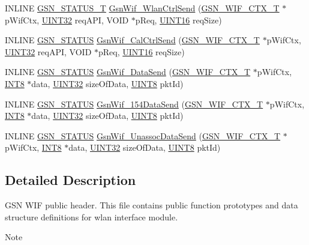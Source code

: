 \begin{DoxyCompactItemize}
\item 
INLINE \hyperlink{a00659_gae36517c0f5872426a7034c9551eb96ac}{GSN\_\-STATUS\_\-T} \hyperlink{a00605_a4192624248f21f0d8d02527671c4fb4d}{GsnWif\_\-WlanCtrlSend} (\hyperlink{a00323}{GSN\_\-WIF\_\-CTX\_\-T} $\ast$pWifCtx, \hyperlink{a00660_gae1e6edbbc26d6fbc71a90190d0266018}{UINT32} reqAPI, VOID $\ast$pReq, \hyperlink{a00660_ga09f1a1fb2293e33483cc8d44aefb1eb1}{UINT16} reqSize)
\item 
INLINE \hyperlink{a00660_gada5951904ac6110b1fa95e51a9ddc217}{GSN\_\-STATUS} \hyperlink{a00605_adf5513ce548ac0e71b01b4b0ef3b75ce}{GsnWif\_\-CalCtrlSend} (\hyperlink{a00323}{GSN\_\-WIF\_\-CTX\_\-T} $\ast$pWifCtx, \hyperlink{a00660_gae1e6edbbc26d6fbc71a90190d0266018}{UINT32} reqAPI, VOID $\ast$pReq, \hyperlink{a00660_ga09f1a1fb2293e33483cc8d44aefb1eb1}{UINT16} reqSize)
\item 
INLINE \hyperlink{a00660_gada5951904ac6110b1fa95e51a9ddc217}{GSN\_\-STATUS} \hyperlink{a00605_a32b31dc339922071e25bd581987f8f5f}{GsnWif\_\-DataSend} (\hyperlink{a00323}{GSN\_\-WIF\_\-CTX\_\-T} $\ast$pWifCtx, \hyperlink{a00660_ga307b8734c020247f6bac4fcde0dcfbb9}{INT8} $\ast$data, \hyperlink{a00660_gae1e6edbbc26d6fbc71a90190d0266018}{UINT32} sizeOfData, \hyperlink{a00660_gab27e9918b538ce9d8ca692479b375b6a}{UINT8} pktId)
\item 
INLINE \hyperlink{a00660_gada5951904ac6110b1fa95e51a9ddc217}{GSN\_\-STATUS} \hyperlink{a00605_ad87f9bd3e0b2f7fc8e6a771b36d486b0}{GsnWif\_\-154DataSend} (\hyperlink{a00323}{GSN\_\-WIF\_\-CTX\_\-T} $\ast$pWifCtx, \hyperlink{a00660_ga307b8734c020247f6bac4fcde0dcfbb9}{INT8} $\ast$data, \hyperlink{a00660_gae1e6edbbc26d6fbc71a90190d0266018}{UINT32} sizeOfData, \hyperlink{a00660_gab27e9918b538ce9d8ca692479b375b6a}{UINT8} pktId)
\item 
INLINE \hyperlink{a00660_gada5951904ac6110b1fa95e51a9ddc217}{GSN\_\-STATUS} \hyperlink{a00605_a0a8a9ba656a608d910401da40fd63196}{GsnWif\_\-UnassocDataSend} (\hyperlink{a00323}{GSN\_\-WIF\_\-CTX\_\-T} $\ast$pWifCtx, \hyperlink{a00660_ga307b8734c020247f6bac4fcde0dcfbb9}{INT8} $\ast$data, \hyperlink{a00660_gae1e6edbbc26d6fbc71a90190d0266018}{UINT32} sizeOfData, \hyperlink{a00660_gab27e9918b538ce9d8ca692479b375b6a}{UINT8} pktId)
\end{DoxyCompactItemize}


\subsection{Detailed Description}
GSN WIF public header. This file contains public function prototypes and data structure definitions for wlan interface module. \begin{DoxyNote}{Note}

\end{DoxyNote}


